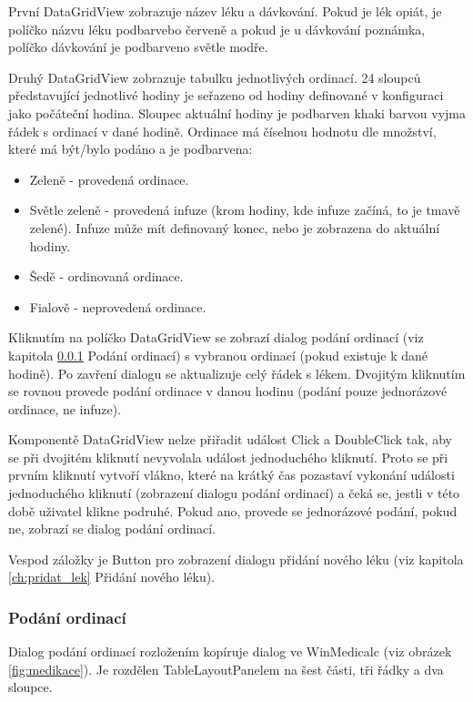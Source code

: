 První DataGridView zobrazuje název léku a dávkování. Pokud je lék opiát, je políčko názvu léku podbarvebo červeně a pokud je u dávkování poznámka, políčko dávkování je podbarveno světle modře.

Druhý DataGridView zobrazuje tabulku jednotlivých ordinací. 24 sloupců představující jednotlivé hodiny je seřazeno od hodiny definované v konfiguraci jako počáteční hodina. Sloupec aktuální hodiny je podbarven khaki barvou vyjma řádek s ordinací v dané hodině. Ordinace má číselnou hodnotu dle množství, které má být/bylo podáno a je podbarvena:

\begin{itemize}
	\item Zeleně - provedená ordinace.
	\item Světle zeleně - provedená infuze (krom hodiny, kde infuze začíná, to je tmavě zelené). Infuze může mít definovaný konec, nebo je zobrazena do aktuální hodiny.
	\item Šedě - ordinovaná ordinace.
	\item Fialově - neprovedená ordinace.
\end{itemize}

Kliknutím na políčko DataGridView se zobrazí dialog podání ordinací (viz kapitola \ref{ch:ordinace} Podání ordinací) s vybranou ordinací (pokud existuje k dané hodině). Po zavření dialogu se aktualizuje celý řádek s lékem. Dvojitým kliknutím se rovnou provede podání ordinace v danou hodinu (podání pouze jednorázové ordinace, ne infuze).

Komponentě DataGridView nelze přiřadit událost Click a DoubleClick tak, aby se při dvojitém kliknutí nevyvolala událost jednoduchého kliknutí. Proto se při prvním kliknutí vytvoří vlákno, které na krátký čas pozastaví vykonání události jednoduchého kliknutí (zobrazení dialogu podání ordinací) a čeká se, jestli v této době uživatel klikne podruhé. Pokud ano, provede se jednorázové podání, pokud ne, zobrazí se dialog podání ordinací.

Vespod záložky je Button pro zobrazení dialogu přidání nového léku (viz kapitola \ref{ch:pridat_lek} Přidání nového léku).


\subsubsection{Podání ordinací}
\label{ch:ordinace}

Dialog podání ordinací rozložením kopíruje dialog ve WinMedicalc (viz obrázek \ref{fig:medikace}). Je rozdělen TableLayoutPanelem na šest části, tři řádky a dva sloupce.

